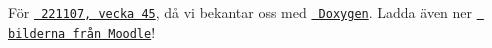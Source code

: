 För \href{http://moodle.molk.se/mod/page/view.php?id=3742}{\texttt{ 221107, vecka 45}}, då vi bekantar oss med \href{https://doxygen.nl/download.html}{\texttt{ Doxygen}}. Ladda även ner \href{http://moodle.molk.se/pluginfile.php/7741/mod_page/content/3/DTP-MUD-images.zip}{\texttt{ bilderna från Moodle}}! 